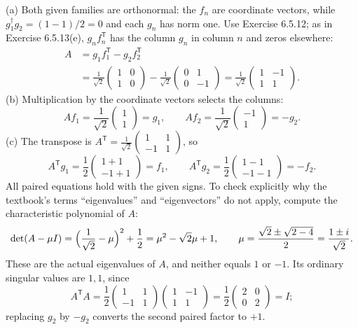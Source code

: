 (a) Both given families are orthonormal: the $f_n$ are coordinate
vectors, while $g_1^\dagger g_2=(1-1)/2=0$ and each $g_n$ has norm one.
Use Exercise 6.5.12; as in Exercise 6.5.13(e), $g_nf_n^{\mathsf T}$
has the column $g_n$ in column $n$ and zeros elsewhere:
\begin{align*}
A&=g_1f_1^{\mathsf T}-g_2f_2^{\mathsf T}\\
&=\frac1{\sqrt2}\begin{pmatrix}1&0\\1&0\end{pmatrix}
 -\frac1{\sqrt2}\begin{pmatrix}0&1\\0&-1\end{pmatrix}
=\boxed{\frac1{\sqrt2}\begin{pmatrix}1&-1\\1&1\end{pmatrix}.}
\end{align*}
(b) Multiplication by the coordinate vectors selects the columns:
\[
Af_1=\frac1{\sqrt2}\begin{pmatrix}1\\1\end{pmatrix}=g_1,
\qquad
Af_2=\frac1{\sqrt2}\begin{pmatrix}-1\\1\end{pmatrix}=-g_2.
\]
(c) The transpose is
$A^{\mathsf T}=\frac1{\sqrt2}\begin{pmatrix}1&1\\-1&1\end{pmatrix}$,
so
\[
A^{\mathsf T}g_1=\frac12\begin{pmatrix}1+1\\-1+1\end{pmatrix}=f_1,
\qquad
A^{\mathsf T}g_2=\frac12\begin{pmatrix}1-1\\-1-1\end{pmatrix}=-f_2.
\]
All paired equations hold with the given signs. To check explicitly
why the textbook's terms ``eigenvalues'' and ``eigenvectors'' do not
apply, compute the characteristic polynomial of $A$:
\[
\det(A-\mu I)
=\Bigl(\frac1{\sqrt2}-\mu\Bigr)^2+\frac12
=\mu^2-\sqrt2\mu+1,
\qquad \mu=\frac{\sqrt2\pm\sqrt{2-4}}{2}=\frac{1\pm i}{\sqrt2}.
\]
These are the actual eigenvalues of $A$, and neither equals $1$ or $-1$.
Its ordinary singular values are $1,1$, since
\[
A^{\mathsf T}A=\frac12\begin{pmatrix}1&1\\-1&1\end{pmatrix}
\begin{pmatrix}1&-1\\1&1\end{pmatrix}
=\frac12\begin{pmatrix}2&0\\0&2\end{pmatrix}=I;
\]
replacing $g_2$ by $-g_2$ converts the second paired factor to $+1$.

